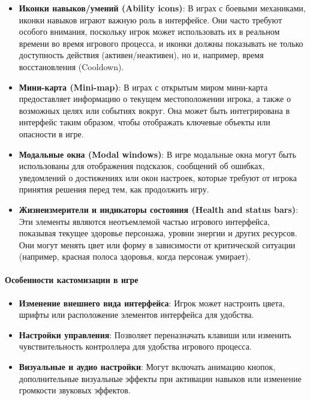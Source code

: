 \documentclass{article}
\begin{document}
\begin{itemize}
\begin{itemize}
    \item \textbf{Иконки навыков/умений (Ability icons)}: В играх с боевыми механиками, иконки навыков играют важную роль в интерфейсе. Они часто требуют особого внимания, поскольку игрок может использовать их в реальном времени во время игрового процесса, и иконки должны показывать не только доступность действия (активен/неактивен), но и, например, время восстановления (Cooldown).
    
    \item \textbf{Мини-карта (Mini-map)}: В играх с открытым миром мини-карта предоставляет информацию о текущем местоположении игрока, а также о возможных целях или событиях вокруг. Она может быть интегрирована в интерфейс таким образом, чтобы отображать ключевые объекты или опасности в игре.
    
    \item \textbf{Модальные окна (Modal windows)}: В игре модальные окна могут быть использованы для отображения подсказок, сообщений об ошибках, уведомлений о достижениях или окон настроек, которые требуют от игрока принятия решения перед тем, как продолжить игру.
    
    \item \textbf{Жизнеизмерители и индикаторы состояния (Health and status bars)}: Эти элементы являются неотъемлемой частью игрового интерфейса, показывая текущее здоровье персонажа, уровни энергии и других ресурсов. Они могут менять цвет или форму в зависимости от критической ситуации (например, красная полоса здоровья, когда персонаж умирает).
\end{itemize}

\paragraph{Особенности кастомизации в игре}
\begin{itemize}
    \item \textbf{Изменение внешнего вида интерфейса}: Игрок может настроить цвета, шрифты или расположение элементов интерфейса для удобства.
    
    \item \textbf{Настройки управления}: Позволяет переназначать клавиши или изменить чувствительность контроллера для удобства игрового процесса.
    
    \item \textbf{Визуальные и аудио настройки}: Могут включать анимацию кнопок, дополнительные визуальные эффекты при активации навыков или изменение громкости звуковых эффектов.
\end{itemize}

\end{itemize}
\end{document}

